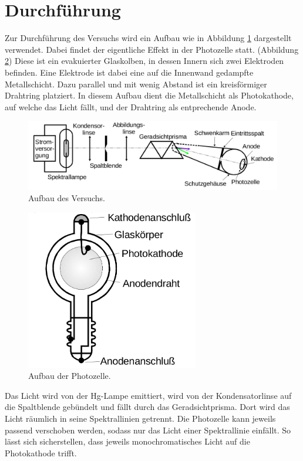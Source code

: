 \section{Durchführung}
\label{sec:Durchführung}

Zur Durchführung des Versuchs wird ein Aufbau wie in Abbildung \ref{fig:Aufbau} dargestellt verwendet. Dabei findet der eigentliche Effekt in der Photozelle statt. (Abbildung \ref{fig:Photo}) Diese ist ein evakuierter Glaskolben, in dessen Innern sich zwei Elektroden befinden. Eine Elektrode ist dabei eine auf die Innenwand gedampfte Metallschicht. Dazu parallel und mit wenig Abstand ist ein kreisförmiger Drahtring platziert. In diesem Aufbau dient die Metallschicht als Photokathode, auf welche das Licht fällt, und der Drahtring als entprechende Anode. 

\begin{figure}
\centering
\includegraphics[width=\textwidth]{data/Aufbau.png}
\caption{Aufbau des Versuchs.}
\label{fig:Aufbau}
\end{figure}

\begin{figure}
\centering
\includegraphics[height=7cm]{data/Photozelle.png}
\caption{Aufbau der Photozelle.}
\label{fig:Photo}
\end{figure}

Das Licht wird von der Hg-Lampe emittiert, wird von der Kondensatorlinse auf die Spaltblende gebündelt und fällt durch das Geradsichtprisma. Dort wird das Licht räumlich in seine Spektrallinien getrennt. Die Photozelle kann jeweils passend verschoben werden, sodass nur das Licht einer Spektrallinie einfällt. So lässt sich sicherstellen, dass jeweils monochromatisches Licht auf die Photokathode trifft.



